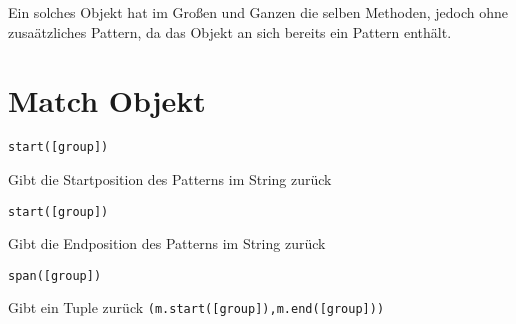 \documentclass[ignorenonframetext,]{beamer}
\begin{document}
\begin{frame}

Ein solches Objekt hat im Großen und Ganzen die selben Methoden, jedoch
ohne zusaätzliches Pattern, da das Objekt an sich bereits ein Pattern
enthält.

\end{frame}

\section{Match Objekt}\label{match-objekt}

\begin{frame}[fragile]

\begin{verbatim}
start([group])
\end{verbatim}

Gibt die Startposition des Patterns im String zurück

\begin{verbatim}
start([group])
\end{verbatim}

Gibt die Endposition des Patterns im String zurück

\begin{verbatim}
span([group])
\end{verbatim}

Gibt ein Tuple zurück \texttt{(m.start({[}group{]}),m.end({[}group{]}))}

\end{frame}
\end{document}
